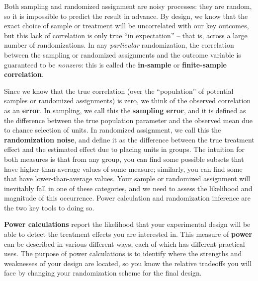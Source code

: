 Both sampling and randomized assignment are noisy processes:
they are random, so it is impossible to predict the result in advance.
By design, we know that the exact choice of sample or treatment
will be uncorrelated with our key outcomes,
but this lack of correlation is only true ``in expectation'' --
that is, across a large number of randomizations.
In any \textit{particular} randomization,
the correlation between the sampling or randomized assignments and the outcome variable
is guaranteed to be \textit{nonzero}:
this is called the \textbf{in-sample} or \textbf{finite-sample correlation}.

Since we know that the true correlation
(over the ``population'' of potential samples or randomized assignments)
is zero, we think of the observed correlation as an \textbf{error}.
In sampling, we call this the \textbf{sampling error},
and it is defined as the difference between the true population parameter
and the observed mean due to chance selection of units.
In randomized assignment, we call this the \textbf{randomization noise},
and define it as the difference between the true treatment effect
and the estimated effect due to placing units in groups.
The intuition for both measures is that from any group,
you can find some possible subsets that have higher-than-average values of some measure;
similarly, you can find some that have lower-than-average values.
Your sample or randomized assignment will inevitably fall in one of these categories,
and we need to assess the likelihood and magnitude of this occurrence.
Power calculation and randomization inference are the two key tools to doing so.

\textbf{Power calculations} report the likelihood that your experimental design
will be able to detect the treatment effects you are interested in.
This measure of \textbf{power} can be described in various different ways,
each of which has different practical uses.
The purpose of power calculations is to identify where the strengths and weaknesses
of your design are located, so you know the relative tradeoffs you will face
by changing your randomization scheme for the final design.

